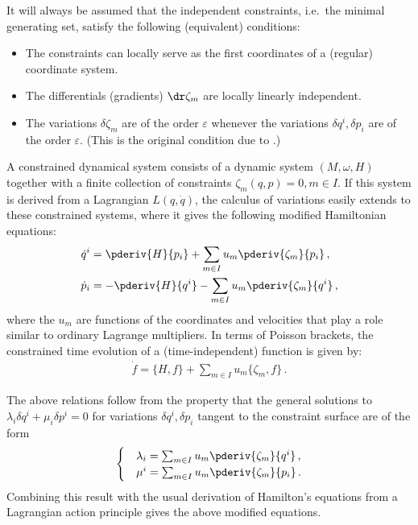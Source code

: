     \begin{axiom}\label{constraint:regularity}
        It will always be assumed that the independent constraints, i.e.~the minimal generating set, satisfy the following (equivalent) conditions:
        \begin{itemize}
            \item The constraints can locally serve as the first coordinates of a (regular) coordinate system.
            \item The differentials (gradients) $\dr\zeta_m$ are locally linearly independent.
            \item The variations $\delta\zeta_m$ are of the order $\varepsilon$ whenever the variations $\delta q^i,\delta p_i$ are of the order $\varepsilon$. (This is the original condition due to .)
        \end{itemize}
    \end{axiom}

    A constrained dynamical system consists of a dynamic system $(M,\omega,H)$ together with a finite collection of constraints $\zeta_m(q,p)=0,m\in I$. If this system is derived from a Lagrangian $L(q,\dot{q})$, the calculus of variations easily extends to these constrained systems, where it gives the following modified Hamiltonian equations:
    \begin{align}
        \dot{q}^i &= \pderiv{H}{p_i} + \sum_{m\in I}u_m\pderiv{\zeta_m}{p_i}\,,\\
        \dot{p}_i &= -\pderiv{H}{q^i} - \sum_{m\in I}u_m\pderiv{\zeta_m}{q^i}\,,
    \end{align}
    where the $u_m$ are functions of the coordinates and velocities that play a role similar to ordinary Lagrange multipliers. In terms of Poisson brackets, the constrained time evolution of a (time-independent) function is given by:
    \begin{gather}
        \label{constraint:modified_poisson_evolution}
        \dot{f} = \{H,f\} + \sum_{m\in I}u_m\{\zeta_m,f\}\,.
    \end{gather}

    \begin{remark}
        The above relations follow from the property that the general solutions to $\lambda_i\delta q^i + \mu_i\delta p^i = 0$ for variations $\delta q^i,\delta p_i$ tangent to the constraint surface are of the form
        \begin{gather}
            \begin{cases}
                &\lambda_i = \sum_{m\in I}u_m\pderiv{\zeta_m}{q^i}\,,\\
                &\mu^i = \sum_{m\in I}u_m\pderiv{\zeta_m}{p_i}\,.
            \end{cases}
        \end{gather}
        Combining this result with the usual derivation of Hamilton's equations from a Lagrangian action principle gives the above modified equations.
    \end{remark}

